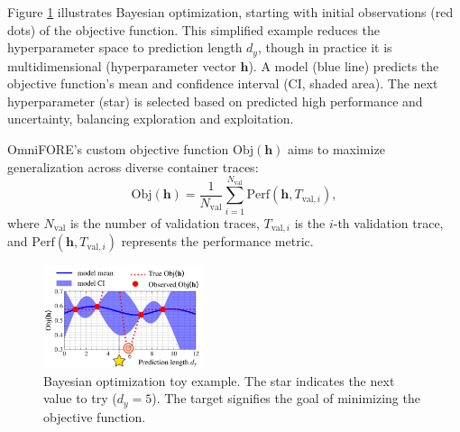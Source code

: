 Figure \ref{fig:gp_toy_example} illustrates Bayesian optimization, starting with initial observations (red dots) of the objective function. This simplified example reduces the hyperparameter space to prediction length $d_y$, though in practice it is multidimensional (hyperparameter vector $\mathbf{h}$). A model (blue line) predicts the objective function's mean and confidence interval (CI, shaded area). The next hyperparameter (star) is selected based on predicted high performance and uncertainty, balancing exploration and exploitation.

OmniFORE's custom objective function $\text{Obj}(\mathbf{h})$ aims to maximize generalization across diverse container traces:
\begin{equation}
    \text{Obj}(\mathbf{h}) = \frac{1}{N_{\text{val}}} \sum_{i=1}^{N_{\text{val}}} \text{Perf}(\mathbf{h}, T_{\text{val}, i}),
\end{equation}
where $N_{\text{val}}$ is the number of validation traces, $T_{\text{val}, i}$ is the $i$-th validation trace, and $\text{Perf}(\mathbf{h}, T_{\text{val}, i})$ represents the performance metric.

\begin{figure}
\centering
\includegraphics[width=0.42\textwidth]{img/gp_toy_example.pdf}
\caption{Bayesian optimization toy example. The star indicates the next value to try ($d_y = 5$). The target signifies the goal of minimizing the objective function.}
\label{fig:gp_toy_example}
\end{figure}
